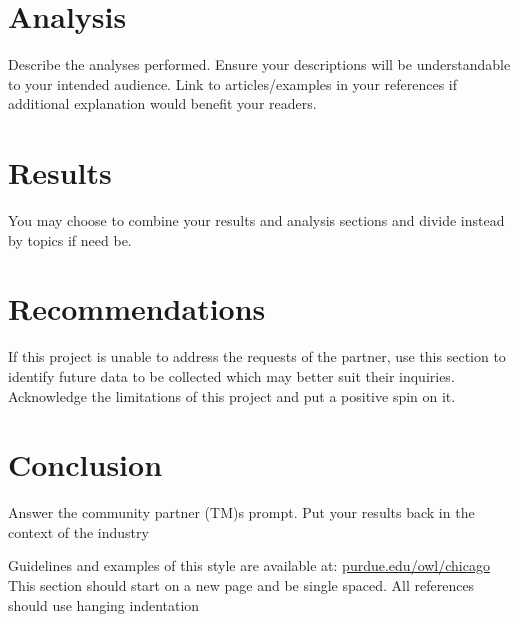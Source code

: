 \documentclass{article}
\begin{document}
\section*{Analysis}
Describe the analyses performed. Ensure your descriptions will be understandable to your intended audience. Link to articles/examples in your references if additional explanation would benefit your readers. 

\section*{Results}
You may choose to combine your results and analysis sections and divide instead by topics if need be.

\section*{Recommendations}
If this project is unable to address the requests of the partner, use this section to identify future data to be collected which may better suit their inquiries. Acknowledge the limitations of this project and put a positive spin on it.

\section*{Conclusion}
Answer the community partner (TM)s prompt. Put your results back in the context of the industry
\autocite{Ex95}

\newpage
\begin{singlespace}
\printbibliography

Guidelines and examples of this style are available at: \href{https://owl.purdue.edu/owl/research_and_citation/chicago_manual_17th_edition/cmos_formatting_and_style_guide/general_format.html}{\uline{\textcolor[HTML]{1155CC}{purdue.edu/owl/chicago}}} This section should start on a new page and be single spaced. All references should use hanging indentation 

\end{singlespace}
\end{document}

